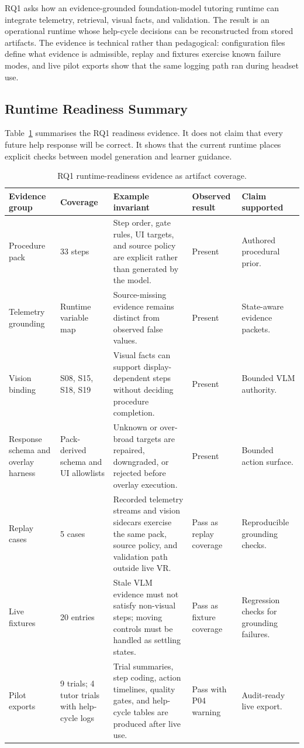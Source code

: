 RQ1 asks how an evidence-grounded foundation-model tutoring runtime can
integrate telemetry, retrieval, visual facts, and validation. The result is an
operational runtime whose help-cycle decisions can be reconstructed from
stored artifacts. The evidence is technical rather than pedagogical:
configuration files define what evidence is admissible, replay and fixtures
exercise known failure modes, and live pilot exports show that the same logging
path ran during headset use.

\subsection{Runtime Readiness Summary}

Table~\ref{tab:rq1-readiness} summarises the RQ1 readiness evidence. It does
not claim that every future help response will be correct. It shows that the
current runtime places explicit checks between model generation and learner
guidance.

\begin{table}[htbp]
\centering
\caption{RQ1 runtime-readiness evidence as artifact coverage.}
\label{tab:rq1-readiness}
\footnotesize
\begin{tabularx}{\textwidth}{@{}p{}p{}p{}p{}X@{}}
\toprule
\textbf{Evidence group} & \textbf{Coverage} & \textbf{Example invariant} & \textbf{Observed result} & \textbf{Claim supported} \\
\midrule
Procedure pack & 33 steps & Step order, gate rules, UI targets, and source policy are explicit rather than generated by the model. & Present & Authored procedural prior. \\
Telemetry grounding & Runtime variable map & Source-missing evidence remains distinct from observed false values. & Present & State-aware evidence packets. \\
Vision binding & S08, S15, S18, S19 & Visual facts can support display-dependent steps without deciding procedure completion. & Present & Bounded VLM authority. \\
Response schema and overlay harness & Pack-derived schema and UI allowlists & Unknown or over-broad targets are repaired, downgraded, or rejected before overlay execution. & Present & Bounded action surface. \\
Replay cases & 5 cases & Recorded telemetry streams and vision sidecars exercise the same pack, source policy, and validation path outside live VR. & Pass as replay coverage & Reproducible grounding checks. \\
Live fixtures & 20 entries & Stale VLM evidence must not satisfy non-visual steps; moving controls must be handled as settling states. & Pass as fixture coverage & Regression checks for grounding failures. \\
Pilot exports & 9 trials; 4 tutor trials with help-cycle logs & Trial summaries, step coding, action timelines, quality gates, and help-cycle tables are produced after live use. & Pass with P04 warning & Audit-ready live export. \\
\bottomrule
\end{tabularx}
\end{table}

